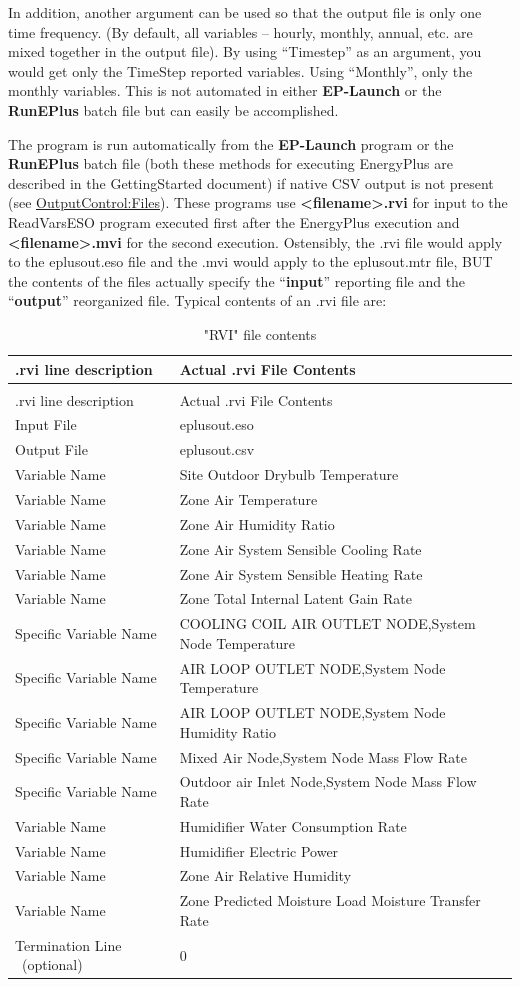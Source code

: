 In addition, another argument can be used so that the output file is only one time frequency. (By default, all variables -- hourly, monthly, annual, etc. are mixed together in the output file). By using ``Timestep'' as an argument, you would get only the TimeStep reported variables. Using ``Monthly'', only the monthly variables. This is not automated in either \textbf{EP-Launch} or the \textbf{RunEPlus} batch file but can easily be accomplished.

The program is run automatically from the \textbf{EP-Launch} program or the \textbf{RunEPlus} batch file (both these methods for executing EnergyPlus are described in the GettingStarted document) if native CSV output is not present (see \hyperref[outputcontrolfiles]{OutputControl:Files}). These programs use \textbf{\textless{}filename\textgreater{}.rvi} for input to the ReadVarsESO program executed first after the EnergyPlus execution and \textbf{\textless{}filename\textgreater{}.mvi} for the second execution. Ostensibly, the .rvi file would apply to the eplusout.eso file and the .mvi would apply to the eplusout.mtr file, BUT the contents of the files actually specify the ``\textbf{input}'' reporting file and the ``\textbf{output}'' reorganized file. Typical contents of an .rvi file are:

\begin{longtable}[c]{p{2.1in}p{3.9in}}
\caption{"RVI" file contents \label{table:rvi-file-contents}} \tabularnewline
\toprule
.rvi line description & Actual .rvi File Contents \tabularnewline
\midrule
\endfirsthead

\caption[]{"RVI" file contents} \tabularnewline
\toprule
.rvi line description & Actual .rvi File Contents \tabularnewline
\midrule
\endhead

Input File & eplusout.eso \tabularnewline
Output File & eplusout.csv \tabularnewline
Variable Name & Site Outdoor Drybulb Temperature \tabularnewline
Variable Name & Zone Air Temperature \tabularnewline
Variable Name & Zone Air Humidity Ratio \tabularnewline
Variable Name & Zone Air System Sensible Cooling Rate \tabularnewline
Variable Name & Zone Air System Sensible Heating Rate \tabularnewline
Variable Name & Zone Total Internal Latent Gain Rate \tabularnewline
Specific Variable Name & COOLING COIL AIR OUTLET NODE,System Node Temperature \tabularnewline
Specific Variable Name & AIR LOOP OUTLET NODE,System Node Temperature \tabularnewline
Specific Variable Name & AIR LOOP OUTLET NODE,System Node Humidity Ratio \tabularnewline
Specific Variable Name & Mixed Air Node,System Node Mass Flow Rate \tabularnewline
Specific Variable Name & Outdoor air Inlet Node,System Node Mass Flow Rate \tabularnewline
Variable Name & Humidifier Water Consumption Rate \tabularnewline
Variable Name & Humidifier Electric Power \tabularnewline
Variable Name & Zone Air Relative Humidity \tabularnewline
Variable Name & Zone Predicted Moisture Load Moisture Transfer Rate \tabularnewline
Termination Line ~(optional) & 0 \tabularnewline
\bottomrule
\end{longtable}

